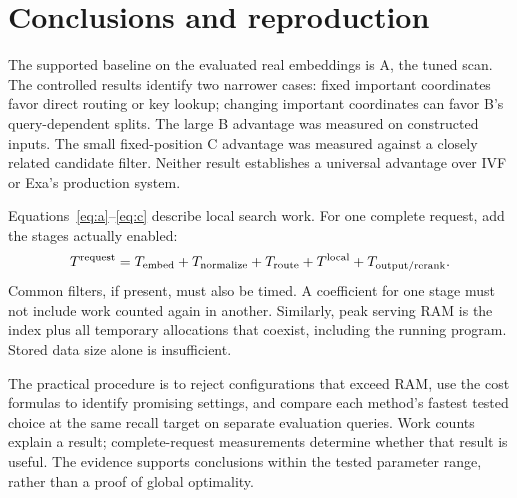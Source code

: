 \documentclass[11pt,a4paper]{article}
\begin{document}
\newpage
\section{Conclusions and reproduction}
The supported baseline on the evaluated real embeddings is A, the tuned scan. The controlled
results identify two narrower cases: fixed important coordinates favor direct routing or
key lookup; changing important coordinates can favor B's query-dependent splits. The large
B advantage was measured on constructed inputs. The small fixed-position C advantage was
measured against a closely related candidate filter. Neither result establishes a universal
advantage over IVF or Exa's production system.

Equations~\ref{eq:a}--\ref{eq:c} describe local search work. For one complete request, add
the stages actually enabled:
\[
 T^{\rm request}=T_{\rm embed}+T_{\rm normalize}+T_{\rm route}
                 +T^{\rm local}+T_{\rm output/rerank}.
\]
Common filters, if present, must also be timed. A coefficient for one stage must not include
work counted again in another. Similarly, peak serving RAM is the index plus all temporary
allocations that coexist, including the running program. Stored data size alone is insufficient.

The practical procedure is to reject configurations that exceed RAM, use the cost formulas
to identify promising settings, and compare each method's fastest tested choice at the same
recall target on separate evaluation queries. Work counts explain a result; complete-request
measurements determine whether that result is useful. The evidence supports conclusions
within the tested parameter range, rather than a proof of global optimality.
\end{document}
